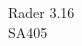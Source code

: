 \documentclass[10pt]{article}
\begin{document}
\begin{center}
  {\sc Rader 3.16}\\
  {\sc SA405} \\
\end{center}

\medskip

 




\end{document}
